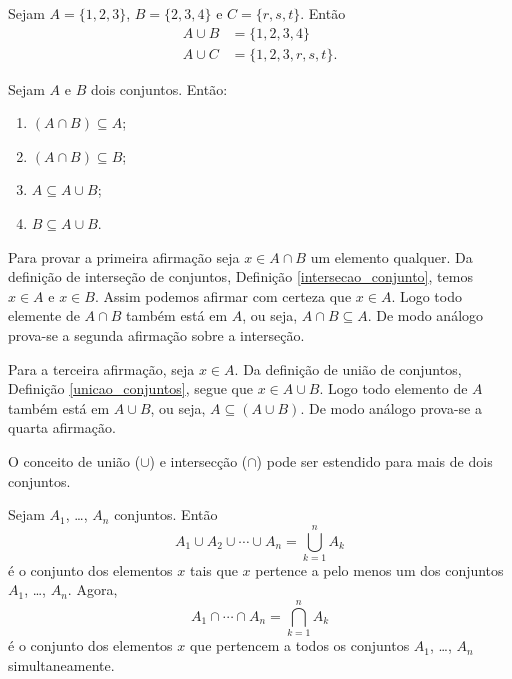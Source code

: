 \begin{exemplo}
    Sejam $A = \{1, 2, 3\}$, $B = \{2, 3, 4\}$ e $C = \{r, s, t\}$. Ent\~ao
    \begin{align*}
        A \cup B &= \{1,2,3,4\}\\
        A \cup C &= \{1,2,3,r,s,t\}.
    \end{align*}
\end{exemplo}

\begin{proposicao} Sejam $A$ e $B$ dois conjuntos. Ent{\~a}o:
    \begin{enumerate}[label={\roman*})]
        \item $(A \cap B) \subseteq A$;
        \item $(A \cap B) \subseteq B$;
        \item $A \subseteq A \cup B$;
        \item $B \subseteq A \cup B$.
    \end{enumerate}
\end{proposicao}
\begin{prova}
    Para provar a primeira afirma\c{c}\~ao seja $x \in A \cap B$ um elemento qualquer. Da defini\c{c}\~ao de interse\c{c}\~ao de conjuntos, Defini\c{c}\~ao \ref{intersecao_conjunto}, temos $x \in A$ e $x \in B$. Assim podemos afirmar com certeza que $x \in A$. Logo todo elemente de $A \cap B$ tamb\'em est\'a em $A$, ou seja, $A \cap B \subseteq A$. De modo an\'alogo prova-se a segunda afirma\c{c}\~ao sobre a interse\c{c}\~ao.

    Para a terceira afirma\c{c}\~ao, seja $x \in A$. Da defini\c{c}\~ao de uni\~ao de conjuntos, Defini\c{c}\~ao \ref{unicao_conjuntos}, segue que $x \in A \cup B$. Logo todo elemento de $A$ tamb\'em est\'a em $A \cup B$, ou seja, $A \subseteq (A \cup B)$. De modo an\'alogo prova-se a quarta afirma\c{c}\~ao.
\end{prova}

O conceito de uni{\~a}o ($ \cup $) e intersec{\c c}{\~a}o ($ \cap $) pode ser estendido para mais de dois conjuntos.

\begin{definicao}
    Sejam $A_{1}$, \dots, $A_{n}$ conjuntos. Ent{\~a}o
    \[
        A_{1} \cup A_{2} \cup \cdots \cup A_{n}= \displaystyle\bigcup_{k=1}^n A_{k}
    \]
    {\'e} o conjunto dos elementos $x$ tais que $x$ pertence a pelo menos um dos conjuntos $A_{1}$, \dots, $A_{n}$. Agora,
    \[
        A_{1} \cap \cdots \cap A_{n} = \displaystyle\bigcap_{k=1}^{n}A_{k}
    \]
    {\'e} o conjunto dos elementos $x$ que pertencem a todos os conjuntos $A_{1}$, \dots, $A_{n}$ simultaneamente.
\end{definicao}

